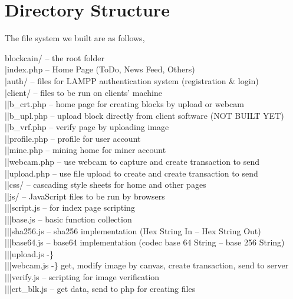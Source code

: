 \section{Directory Structure}
The file system we built are as follows, \\
\begin{footnotesize}
blockcain/ -- the root folder \\
|\myTab	index.php -- Home Page (ToDo, News Feed, Others) \\
|\myTab	auth/ -- files for LAMPP authentication system (registration \& login) \\ 
|\myTab	client/ -- files to be run on clients' machine \\
|\myTab |\myTab b\_crt.php -- home page for creating blocks by upload or webcam \\
|\myTab |\myTab b\_upl.php -- upload block directly from client software (NOT BUILT YET) \\
|\myTab |\myTab b\_vrf.php -- verify page by uploading image \\
|\myTab |\myTab profile.php -- profile for user account \\
|\myTab |\myTab mine.php -- mining home for miner account \\
|\myTab |\myTab webcam.php -- use webcam to capture and create transaction to send \\
|\myTab |\myTab upload.php -- use file upload to create and create transaction to send \\
|\myTab |\myTab css/ -- cascading style sheets for home and other pages \\
|\myTab |\myTab js/ -- JavaScript files to be run by browsers \\
|\myTab |\myTab |\myTab script.js -- for index page scripting \\
|\myTab |\myTab |\myTab base.js -- basic function collection \\
|\myTab |\myTab |\myTab sha256.js -- sha256 implementation (Hex String In -- Hex String Out) \\
|\myTab |\myTab |\myTab base64.js -- base64 implementation (codec base 64 String -- base 256 String) \\
|\myTab |\myTab |\myTab upload.js -\} \\
|\myTab |\myTab |\myTab webcam.js -\} get, modify image by canvas, create transaction, send to server \\
|\myTab |\myTab |\myTab verify.js -- scripting for image verification \\
|\myTab |\myTab |\myTab crt\_blk.js -- get data, send to php for creating files \\

\end{footnotesize}
